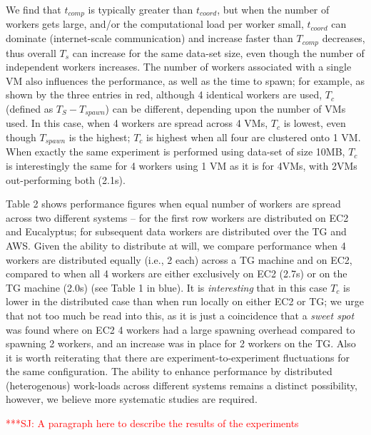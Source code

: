\documentclass[conference,final]{IEEEtran}
\newcommand{\jhanote}[1]{ {\textcolor{red} { ***SJ: #1 }}}
\newcommand{\jhanote}[1]{}
\begin{document}
We find that $t_{comp}$ is typically greater than $t_{coord}$, but
when the number of workers gets large, and/or the computational load
per worker small, $t_{coord}$ can dominate (internet-scale
communication) and increase faster than $T_{comp}$ decreases, thus
overall $T_s$ can increase for the same data-set size, even though the
number of independent workers increases.  The number of workers
associated with a single VM also influences the performance, as well
as the time to spawn; for example, as shown by the three entries in
red, although 4 identical workers are used, $T_c$ (defined as $T_S -
T_{spawn} $) can be different, depending upon the number of VMs
used. In this case, when 4 workers are spread across 4 VMs, $T_c$ is
lowest, even though $T_{spawn}$ is the highest; $T_c$ is highest when
all four are clustered onto 1 VM. When exactly the same experiment is
performed using data-set of size 10MB, $T_c$ is interestingly the same
for 4 workers using 1 VM as it is for 4VMs, with 2VMs out-performing
both (2.1s).

Table 2 shows performance figures when equal number of workers are
spread across two different systems -- for the first row workers are
distributed on EC2 and Eucalyptus; for subsequent data workers are
distributed over the TG and AWS. Given the ability to distribute at
will, we compare performance when 4 workers are distributed equally
(i.e., 2 each) across a TG machine and on EC2, compared to when all 4
workers are either exclusively on EC2 (2.7s) or on the TG machine
(2.0s) (see Table 1 in blue). It is {\it interesting} that in this
case $T_c$ is lower in the distributed case than when run locally on
either EC2 or TG; we urge that not too much be read into this, as it
is just a coincidence that a {\it sweet spot} was found where on EC2 4
workers had a large spawning overhead compared to spawning 2 workers,
and an increase was in place for 2 workers on the TG. Also it is worth
reiterating that there are experiment-to-experiment fluctuations for
the same configuration. The ability to enhance performance by
distributed (heterogenous) work-loads across different systems remains
a distinct possibility, however, we believe more systematic studies
are required.



\jhanote{A paragraph here to describe the results of the experiments}
\end{document}
